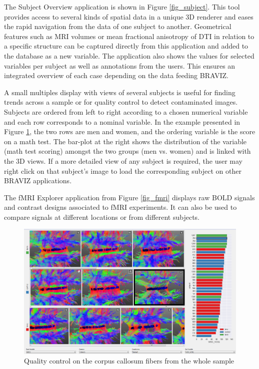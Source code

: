 \documentclass[twocolumn]{svjour3}
\begin{document}
The Subject Overview application is shown in Figure \ref{fig_subject}. This tool  provides access to several kinds of spatial data in a unique 3D renderer and eases the rapid navigation from the data of one subject to another. Geometrical features such as MRI volumes or mean fractional anisotropy of DTI in relation to a specific structure can be captured directly from this application and added to the database as a new variable. The application also shows the values for selected variables per subject as well as annotations from the users. This ensures an integrated overview of each case depending on the data feeding BRAVIZ.

A small multiples display \cite{tufte_visual_1983} with views  of several subjects is useful for finding trends across a sample or for quality control to detect contaminated images. Subjects are ordered from left to right according to a chosen numerical variable and each row corresponds to a nominal variable. In the example presented in Figure \ref{fig_sample}, the two rows are men and women, and the ordering variable is the score on a math test. The bar-plot at the right shows the distribution of the variable (math test scoring) amongst the two groups (men vs. women) and is linked with the 3D views. If a more detailed view of any subject is required, the user may right click on that subject’s image to load the corresponding subject on other BRAVIZ applications.

The fMRI Explorer application from Figure \ref{fig_fmri} displays raw BOLD signals and contrast designs associated to fMRI experiments. It can also be used to compare signals at different locations or from different subjects.

\begin{figure}
\begin{center}
\includegraphics[width=\linewidth]{quality_control_trim}
\end{center}
 \caption{\label{fig_sample} Quality control on the corpus callosum fibers from the whole sample}
\end{figure}
\end{document}
